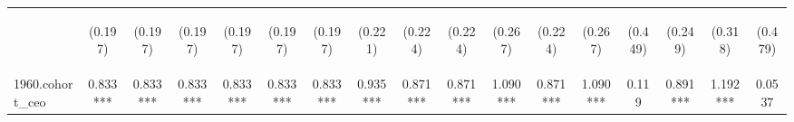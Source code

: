 \begin{center}
\begin{tabular}{lcccccccccccccccc}
\vspace{4pt} & \begin{footnotesize}(0.197)\end{footnotesize} & \begin{footnotesize}(0.197)\end{footnotesize} & \begin{footnotesize}(0.197)\end{footnotesize} & \begin{footnotesize}(0.197)\end{footnotesize} & \begin{footnotesize}(0.197)\end{footnotesize} & \begin{footnotesize}(0.197)\end{footnotesize} & \begin{footnotesize}(0.221)\end{footnotesize} & \begin{footnotesize}(0.224)\end{footnotesize} & \begin{footnotesize}(0.224)\end{footnotesize} & \begin{footnotesize}(0.267)\end{footnotesize} & \begin{footnotesize}(0.224)\end{footnotesize} & \begin{footnotesize}(0.267)\end{footnotesize} & \begin{footnotesize}(0.449)\end{footnotesize} & \begin{footnotesize}(0.249)\end{footnotesize} & \begin{footnotesize}(0.318)\end{footnotesize} & \begin{footnotesize}(0.479)\end{footnotesize} \\
1960.cohort\_ceo & 0.833*** & 0.833*** & 0.833*** & 0.833*** & 0.833*** & 0.833*** & 0.935*** & 0.871*** & 0.871*** & 1.090*** & 0.871*** & 1.090*** & 0.119 & 0.891*** & 1.192*** & 0.0537 \\

\end{tabular}
\end{center}
